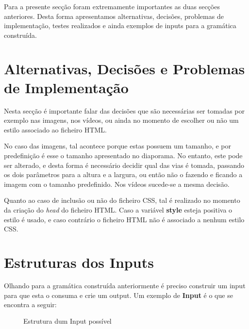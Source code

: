 \documentclass[11pt,a4paper]{report}
\begin{document}
Para a presente secção foram extremamente importantes as duas secções anteriores. Desta forma apresentamos alternativas, decisões, problemas de implementação, testes realizados e ainda exemplos de inputs para a gramática construída.


\section{Alternativas, Decisões e Problemas de Implementação}

Nesta secção é importante falar das decisões que são necessárias ser tomadas por exemplo nas imagens, nos vídeos, ou ainda no momento de escolher ou não um estilo associado ao ficheiro HTML.

No caso das imagens, tal acontece porque estas possuem um tamanho, e por predefinição é esse o tamanho apresentado no diaporama. No entanto, este pode ser alterado, e desta forma é necessário decidir qual das vias é tomada, passando os dois parâmetros para a altura e a largura, ou então não o fazendo e ficando a imagem com o tamanho predefinido. Nos vídeos sucede-se a mesma decisão.

Quanto ao caso de inclusão ou não do ficheiro CSS, tal é realizado no momento da criação do \textit{head} do ficheiro HTML. Caso a variável \textbf{style} esteja positiva o estilo é usado, e caso contrário o ficheiro HTML não é associado a nenhum estilo CSS.

\section{Estruturas dos Inputs}

Olhando para a gramática construída anteriormente é preciso construir um input para que esta o consuma e crie um output. Um exemplo de \textbf{Input} é o que se encontra a seguir:

\begin{figure}[H]
\centering
{}
\caption{Estrutura dum Input possível}
\label{img:input}
\end{figure}
\end{document}
